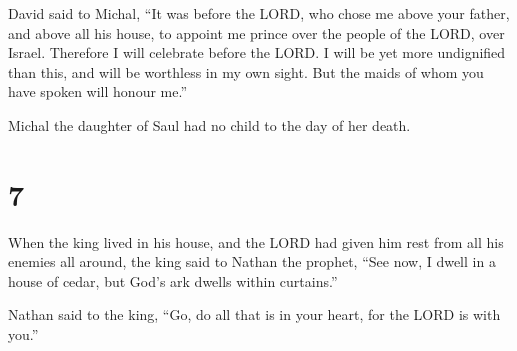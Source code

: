  David said to Michal, ``It was before the LORD, who chose
me above your father, and above all his house, to appoint me prince over
the people of the LORD, over Israel. Therefore I will celebrate before
the LORD.  I will be yet more undignified than this, and
will be worthless in my own sight. But the maids of whom you have spoken
will honour me.''

 Michal the daughter of Saul had no child to the day of her
death.

\hypertarget{section-6}{%
\section{7}\label{section-6}}

 When the king lived in his house, and the LORD had given
him rest from all his enemies all around,  the king said to
Nathan the prophet, ``See now, I dwell in a house of cedar, but God's
ark dwells within curtains.''

 Nathan said to the king, ``Go, do all that is in your
heart, for the LORD is with you.''

